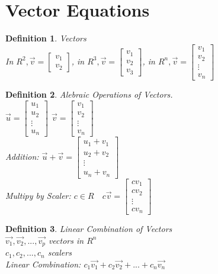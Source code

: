 \documentclass[a4paper,12pt,openany]{book}
\theoremstyle{defn}
\newtheorem{defn}{Definition}[section]
\theoremstyle{expl}
\begin{document}
\section{Vector Equations}
\begin{defn}
\textup{Vectors\\
In $R^2, \vec{v} = \left[\begin{array}{c} v_1 \\ v_2 \end{array}\right]$, in $R^3, \vec{v}=\left[\begin{array}{c} v_1 \\ v_2 \\v_3\end{array}\right]$, in $R^n, \vec{v} =\left[\begin{array}{c} v_1 \\ v_2 \\ \vdots \\ v_n\end{array}\right]$}\end{defn}
\begin{defn}
\textup{
Alebraic Operations of Vectors.\\
$\vec{u}=\left[\begin{array}{c} u_1\\u_2\\\vdots\\u_n \end{array}\right]$
$\vec{v}=\left[\begin{array}{c} v_1\\v_2\\\vdots\\v_n \end{array}\right]$\\
Addition: $\vec{u}+\vec{v}= \left[\begin{array}{c} u_1+v_1\\u_2+v_2\\\vdots\\u_n+v_n \end{array}\right]$\\
Multipy by Scaler: $c\in R\quad c\vec{v}=\left[\begin{array}{c} cv_1\\cv_2\\\vdots\\cv_n \end{array}\right]$
}\end{defn}

\begin{defn}
\textup{
Linear Combination of Vectors\\
$\vec{v_1},\vec{v_2},...,\vec{v_p}$ vectors in $R^n$\\
$c_1,c_2,...,c_n$ scalers\\
Linear Combination: $c_1\vec{v_1}+c_2\vec{v_2}+...+c_n\vec{v_n}$
}\end{defn}
\end{document}
